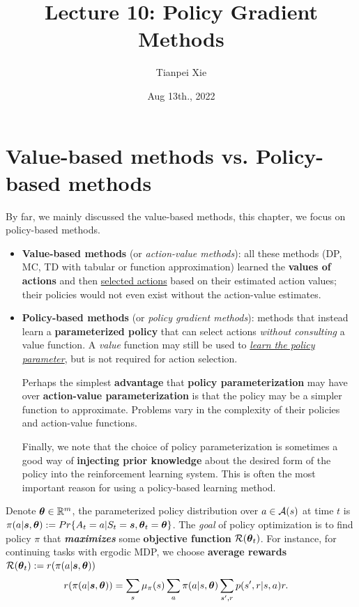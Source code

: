 \documentclass[11pt]{article}
\begin{document}
\title{Lecture 10: Policy Gradient Methods}
\author{Tianpei Xie}
\date{ Aug 13th., 2022 }
\maketitle
\tableofcontents
\newpage
\section{Value-based methods vs. Policy-based methods}
By far, we mainly discussed the value-based methods, this chapter, we focus on policy-based methods. 
\begin{itemize}
\item \textbf{Value-based methods} (or \emph{action-value methods}): all these methods (DP, MC, TD with tabular or function approximation) learned the \textbf{values of actions} and then \underline{selected actions} based on their estimated action values; their policies would not even exist without the action-value estimates.

\item \textbf{Policy-based methods} (or \emph{policy gradient methods}): methods that instead learn a \textbf{parameterized policy} that can select actions \emph{without consulting} a value function.  A \emph{value}
function may still be used to \underline{\emph{learn the policy parameter}}, but is not required for action selection. 

Perhaps the simplest \textbf{advantage} that \textbf{policy parameterization} may have over \textbf{action-value parameterization} is that the policy may be a simpler function to approximate. Problems vary in the complexity of their policies and action-value functions. 


Finally, we note that the choice of policy parameterization is sometimes a good way of \textbf{injecting prior knowledge} about the desired form of the policy into the reinforcement learning system. This is often the most important reason for using a policy-based learning method.
\end{itemize}

Denote $\boldsymbol{\theta} \in {\mathbb R}^{m}$, the parameterized policy distribution over $a \in {\mathcal A}(s)$ at time $t$ is $\pi(a |\boldsymbol{s}, \boldsymbol{\theta}) := Pr\{A_t =a | S_{t}=\boldsymbol{s}, \boldsymbol{\theta}_t=\boldsymbol{\theta}\}$. The \emph{goal} of policy optimization is to find policy $\pi$ that \emph{\textbf{maximizes}} some \textbf{objective function} ${\mathcal R}(\boldsymbol{\theta}_t)$. For instance, for continuing tasks with ergodic MDP, we choose \textbf{average rewards} ${\mathcal R}(\boldsymbol{\theta}_t) := r(\pi(a |\boldsymbol{s}, \boldsymbol{\theta}))$
\begin{align}
r(\pi(a |\boldsymbol{s}, \boldsymbol{\theta})) &= \sum_{s}\mu_{\pi}(s)\sum_{a}\pi(a |s, \boldsymbol{\theta}) \sum_{s', r}p(s', r| s, a)r.  \label{eqn: avg_reward_discount_continuing3}
\end{align}
\end{document}
